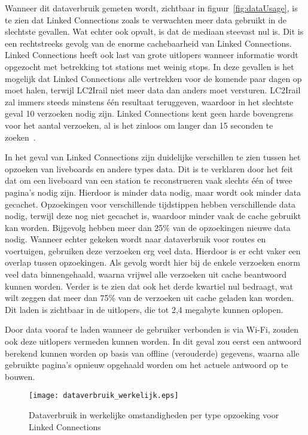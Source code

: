 Wanneer dit dataverbruik gemeten wordt, zichtbaar in figuur~\ref{fig:dataUsage}, is te zien dat Linked Connections zoals te verwachten meer data gebruikt in de slechtste gevallen. Wat echter ook opvalt, is dat de mediaan steevast nul is. Dit is een rechtstreeks gevolg van de enorme cachebaarheid van Linked Connections. Linked Connections heeft ook last van grote uitlopers wanneer informatie wordt opgezocht met betrekking tot stations met weinig stops. In deze gevallen is het mogelijk dat Linked Connections alle vertrekken voor de komende paar dagen op moet halen, terwijl LC2Irail niet meer data dan anders moet versturen. LC2Irail zal immers steeds minstens één resultaat teruggeven, waardoor in het slechtste geval 10 verzoeken nodig zijn. Linked Connections kent geen harde bovengrens voor het aantal verzoeken, al is het zinloos om langer dan 15 seconden te zoeken~\citep{miller68}.

In het geval van Linked Connections zijn duidelijke verschillen te zien tussen het opzoeken van liveboards en andere types data. Dit is te verklaren door het feit dat om een liveboard van een station te reconstrueren vaak slechts één of twee pagina's nodig zijn. Hierdoor is minder data nodig, maar wordt ook minder data gecachet. Opzoekingen voor verschillende tijdstippen hebben verschillende data nodig, terwijl deze nog niet gecachet is, waardoor minder vaak de cache gebruikt kan worden. Bijgevolg hebben meer dan 25\% van de opzoekingen nieuwe data nodig.
Wanneer echter gekeken wordt naar dataverbruik voor routes en voertuigen, gebruiken deze verzoeken erg veel data. Hierdoor is er echt vaker een overlap tussen opzoekingen. Als gevolg wordt hier bij de enkele verzoeken enorm veel data binnengehaald, waarna vrijwel alle verzoeken uit cache beantwoord kunnen worden. Verder is te zien dat ook het derde kwartiel nul bedraagt, wat wilt zeggen dat meer dan 75\% van de verzoeken uit cache geladen kan worden. Dit laden is zichtbaar in de uitlopers, die tot 2,4 megabyte kunnen oplopen.

Door data vooraf te laden wanneer de gebruiker verbonden is via Wi-Fi, zouden ook deze uitlopers vermeden kunnen worden. In dit geval zou eerst een antwoord berekend kunnen worden op basis van offline (verouderde) gegevens, waarna alle gebruikte pagina's opnieuw opgehaald worden om het actuele antwoord op te bouwen.


\begin{figure}[ht]
	\centering
	\texttt{[image: dataverbruik\_werkelijk.eps]}
	\caption[Werkelijk dataverbruik per opzoeking Linked Connections]{Dataverbruik in werkelijke omstandigheden per type opzoeking voor Linked Connections}
	\label{fig:dataUsageRealLife}
\end{figure}

